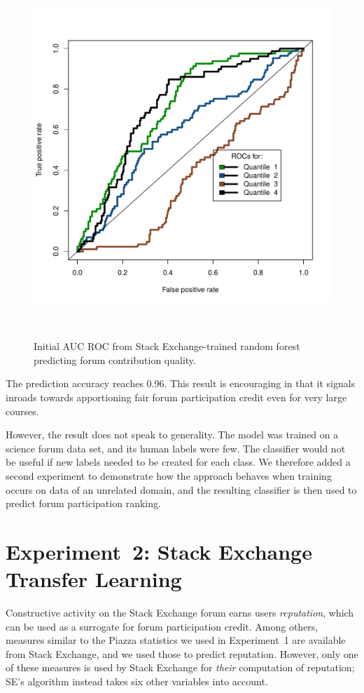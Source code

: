 \begin{figure}
  \includegraphics[width=0.8\columnwidth]{Figs/SE_predict_Forum_roc_bad_news.pdf}
  \caption{Initial AUC ROC from Stack Exchange-trained random forest
    predicting forum contribution quality.}
  ~\label{fig:badNews}
\end{figure}


The prediction accuracy reaches 0.96. This result is encouraging in
that it signals inroads towards apportioning fair forum participation
credit even for very large courses.

However, the result does not speak to generality. The model was
trained on a science forum data set, and its human labels were
few. The classifier would not be useful if new labels needed to be
created for each class. We therefore added a second experiment to
demonstrate how the approach behaves when training occurs on data of
an unrelated domain, and the resulting classifier is then used to
predict forum participation ranking.

\section{Experiment~2: Stack Exchange Transfer Learning}
\label{sec:exp2}

Constructive activity on the Stack Exchange \cite{stackex} forum earns
users \emph{reputation}, which can be used as a surrogate for forum
participation credit. Among others, measures similar to the Piazza
statistics we used in Experiment~1 are available from Stack Exchange,
and we used those to predict reputation. However, only one of these
measures is used by Stack Exchange for {\em their} computation of
reputation; SE's algorithm instead takes six other variables into
account.

